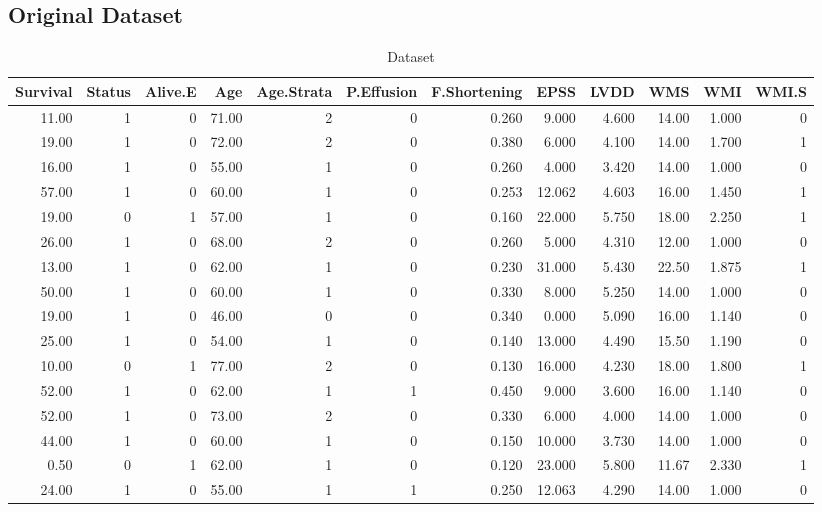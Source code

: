 \documentclass[
]{article}
\begin{document}
\hypertarget{original-dataset}{%
\subsection{Original Dataset}\label{original-dataset}}

\begin{table}

\caption{\label{tab:Dataset.actual}Dataset}
\centering
\begin{tabular}[t]{r|r|r|r|r|r|r|r|r|r|r|r}
\hline
Survival & Status & Alive.E & Age & Age.Strata & P.Effusion & F.Shortening & EPSS & LVDD & WMS & WMI & WMI.S\\
\hline
11.00 & 1 & 0 & 71.00 & 2 & 0 & 0.260 & 9.000 & 4.600 & 14.00 & 1.000 & 0\\
\hline
19.00 & 1 & 0 & 72.00 & 2 & 0 & 0.380 & 6.000 & 4.100 & 14.00 & 1.700 & 1\\
\hline
16.00 & 1 & 0 & 55.00 & 1 & 0 & 0.260 & 4.000 & 3.420 & 14.00 & 1.000 & 0\\
\hline
57.00 & 1 & 0 & 60.00 & 1 & 0 & 0.253 & 12.062 & 4.603 & 16.00 & 1.450 & 1\\
\hline
19.00 & 0 & 1 & 57.00 & 1 & 0 & 0.160 & 22.000 & 5.750 & 18.00 & 2.250 & 1\\
\hline
26.00 & 1 & 0 & 68.00 & 2 & 0 & 0.260 & 5.000 & 4.310 & 12.00 & 1.000 & 0\\
\hline
13.00 & 1 & 0 & 62.00 & 1 & 0 & 0.230 & 31.000 & 5.430 & 22.50 & 1.875 & 1\\
\hline
50.00 & 1 & 0 & 60.00 & 1 & 0 & 0.330 & 8.000 & 5.250 & 14.00 & 1.000 & 0\\
\hline
19.00 & 1 & 0 & 46.00 & 0 & 0 & 0.340 & 0.000 & 5.090 & 16.00 & 1.140 & 0\\
\hline
25.00 & 1 & 0 & 54.00 & 1 & 0 & 0.140 & 13.000 & 4.490 & 15.50 & 1.190 & 0\\
\hline
10.00 & 0 & 1 & 77.00 & 2 & 0 & 0.130 & 16.000 & 4.230 & 18.00 & 1.800 & 1\\
\hline
52.00 & 1 & 0 & 62.00 & 1 & 1 & 0.450 & 9.000 & 3.600 & 16.00 & 1.140 & 0\\
\hline
52.00 & 1 & 0 & 73.00 & 2 & 0 & 0.330 & 6.000 & 4.000 & 14.00 & 1.000 & 0\\
\hline
44.00 & 1 & 0 & 60.00 & 1 & 0 & 0.150 & 10.000 & 3.730 & 14.00 & 1.000 & 0\\
\hline
0.50 & 0 & 1 & 62.00 & 1 & 0 & 0.120 & 23.000 & 5.800 & 11.67 & 2.330 & 1\\
\hline
24.00 & 1 & 0 & 55.00 & 1 & 1 & 0.250 & 12.063 & 4.290 & 14.00 & 1.000 & 0\\

\end{tabular}
\end{table}
\end{document}
